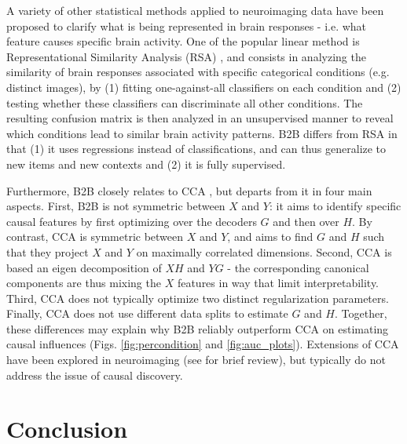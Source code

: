\documentclass{article}
\begin{document}
A variety of other statistical methods applied to neuroimaging data have been proposed to clarify what is being represented in brain responses - i.e. what feature causes specific brain activity. One of the popular linear method is Representational Similarity Analysis (RSA) \citep{kriegeskorte2008representational}, and consists in analyzing the similarity of brain responses associated with specific categorical conditions (e.g. distinct images), by (1) fitting one-against-all classifiers on each condition and (2) testing whether these classifiers can discriminate all other conditions. The resulting confusion matrix is then analyzed in an unsupervised manner to reveal which conditions lead to similar brain activity patterns. B2B differs from RSA in that (1) it uses regressions instead of classifications, and can thus generalize to new items and new contexts and (2) it is fully supervised.

Furthermore, B2B closely relates to CCA \citep{cca_hotelling}, but departs from it in four main aspects. First, B2B is not symmetric between $X$ and $Y$: it aims to identify specific causal features by first optimizing over the decoders $G$ and then over $H$. By contrast, CCA is symmetric between $X$ and $Y$, and aims to find $G$ and $H$ such that they project $X$ and $Y$ on maximally correlated dimensions. Second, CCA is based an eigen decomposition of $XH$ and $YG$ - the corresponding canonical components are thus mixing the $X$ features in way that limit interpretability. Third, CCA does not typically optimize two distinct regularization parameters. Finally, CCA does not use different data splits to estimate $G$ and $H$. Together, these differences may explain why B2B reliably outperform CCA on estimating causal influences (Figs. \ref{fig:percondition} and \ref{fig:auc_plots}). Extensions of CCA have been explored in neuroimaging (see \citep{de2019multiway} for brief review), but typically do not address the issue of causal discovery.




\section{Conclusion}


\clearpage
\newpage




% 

%


\end{document}
